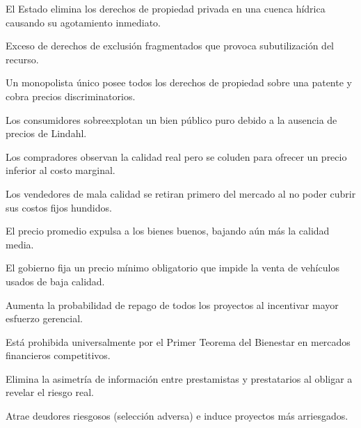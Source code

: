 \begin{opts}
    \item El Estado elimina los derechos de propiedad privada en una cuenca hídrica causando su agotamiento inmediato.
    \item Exceso de derechos de exclusión fragmentados que provoca subutilización del recurso.
    \item Un monopolista único posee todos los derechos de propiedad sobre una patente y cobra precios discriminatorios.
    \item Los consumidores sobreexplotan un bien público puro debido a la ausencia de precios de Lindahl.
\end{opts}

\begin{opts}
    \item Los compradores observan la calidad real pero se coluden para ofrecer un precio inferior al costo marginal.
    \item Los vendedores de mala calidad se retiran primero del mercado al no poder cubrir sus costos fijos hundidos.
    \item El precio promedio expulsa a los bienes buenos, bajando aún más la calidad media.
    \item El gobierno fija un precio mínimo obligatorio que impide la venta de vehículos usados de baja calidad.
\end{opts}

\begin{opts}
    \item Aumenta la probabilidad de repago de todos los proyectos al incentivar mayor esfuerzo gerencial.
    \item Está prohibida universalmente por el Primer Teorema del Bienestar en mercados financieros competitivos.
    \item Elimina la asimetría de información entre prestamistas y prestatarios al obligar a revelar el riesgo real.
    \item Atrae deudores riesgosos (selección adversa) e induce proyectos más arriesgados.
\end{opts}

